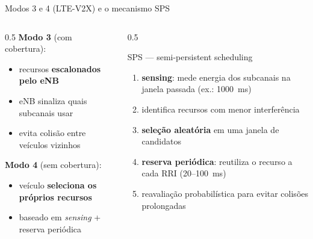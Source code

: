 \documentclass[aspectratio=169,11pt]{beamer}
\begin{document}
\begin{frame}{Modos 3 e 4 (LTE-V2X) e o mecanismo SPS}
  \begin{columns}
    \begin{column}{0.5\textwidth}
      \textbf{Modo 3} (com cobertura):
      \begin{itemize}
        \item recursos \textbf{escalonados pelo eNB}
        \item eNB sinaliza quais subcanais usar
        \item evita colisão entre veículos vizinhos
      \end{itemize}
      \textbf{Modo 4} (sem cobertura):
      \begin{itemize}
        \item veículo \textbf{seleciona os próprios recursos}
        \item baseado em \emph{sensing} + reserva periódica
      \end{itemize}
    \end{column}
    \begin{column}{0.5\textwidth}
      \begin{block}{SPS --- semi-persistent scheduling}
        \begin{enumerate}
          \item \textbf{sensing}: mede energia dos subcanais na janela passada (ex.: 1000~ms)
          \item identifica recursos com menor interferência
          \item \textbf{seleção aleatória} em uma janela de candidatos
          \item \textbf{reserva periódica}: reutiliza o recurso a cada RRI (20--100~ms)
          \item reavaliação probabilística para evitar colisões prolongadas
        \end{enumerate}
      \end{block}
    \end{column}
  \end{columns}
\end{frame}
\end{document}
